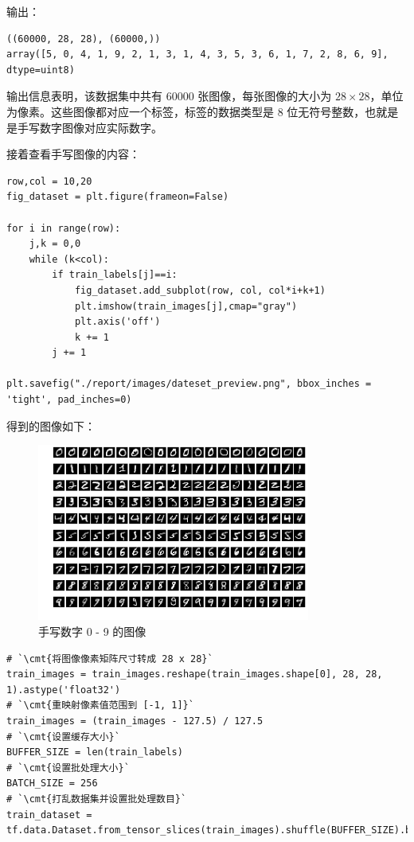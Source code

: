 \documentclass[a4paper, 12pt]{article}
\begin{document}
输出：

\begin{lstlisting}[style=myPlain]
((60000, 28, 28), (60000,))
array([5, 0, 4, 1, 9, 2, 1, 3, 1, 4, 3, 5, 3, 6, 1, 7, 2, 8, 6, 9], dtype=uint8)
\end{lstlisting}

输出信息表明，该数据集中共有 60000 张图像，每张图像的大小为 $28 \times 28$，单位为像素。这些图像都对应一个标签，标签的数据类型是 8 位无符号整数，也就是是手写数字图像对应实际数字。


接着查看手写图像的内容：

\begin{lstlisting}[style=myPython,caption={查看手写图像}]
row,col = 10,20
fig_dataset = plt.figure(frameon=False)

for i in range(row):
    j,k = 0,0
    while (k<col):
        if train_labels[j]==i:
            fig_dataset.add_subplot(row, col, col*i+k+1)
            plt.imshow(train_images[j],cmap="gray")
            plt.axis('off')
            k += 1
        j += 1

plt.savefig("./report/images/dateset_preview.png", bbox_inches = 'tight', pad_inches=0)
\end{lstlisting}

得到的图像如下：

\begin{figure}[htbp]
\centering
\includegraphics[width=0.8\textwidth]{images/dateset_preview.png}
\caption{手写数字 0 - 9 的图像}
\end{figure}

\begin{lstlisting}[style=myPython,caption={预处理图像数据}]
# `\cmt{将图像像素矩阵尺寸转成 28 x 28}`
train_images = train_images.reshape(train_images.shape[0], 28, 28, 1).astype('float32')
# `\cmt{重映射像素值范围到 [-1, 1]}`
train_images = (train_images - 127.5) / 127.5 
# `\cmt{设置缓存大小}`
BUFFER_SIZE = len(train_labels)
# `\cmt{设置批处理大小}`
BATCH_SIZE = 256
# `\cmt{打乱数据集并设置批处理数目}`
train_dataset = tf.data.Dataset.from_tensor_slices(train_images).shuffle(BUFFER_SIZE).batch(BATCH_SIZE)
\end{lstlisting}
\end{document}
